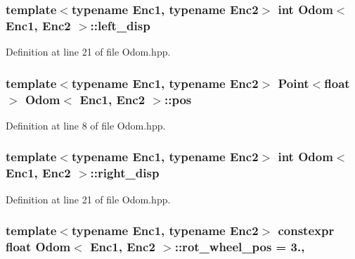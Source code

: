 \hypertarget{classOdom_aa29154456ebb189815df2501cc8eb2fd}{
\subsubsection[{left\-\_\-disp}]{\setlength{\rightskip}{0pt plus 5cm}template$<$typename Enc1, typename Enc2$>$ int {\bf Odom}$<$ Enc1, Enc2 $>$\-::left\-\_\-disp}}\label{classOdom_aa29154456ebb189815df2501cc8eb2fd}


Definition at line 21 of file Odom.\-hpp.

\hypertarget{classOdom_a0e43d9feb433dec91e7a08cee64d732b}{
\subsubsection[{pos}]{\setlength{\rightskip}{0pt plus 5cm}template$<$typename Enc1, typename Enc2$>$ {\bf Point}$<$float$>$ {\bf Odom}$<$ Enc1, Enc2 $>$\-::pos\hspace{0.3cm}{\ttfamily [private]}}}\label{classOdom_a0e43d9feb433dec91e7a08cee64d732b}


Definition at line 8 of file Odom.\-hpp.

\hypertarget{classOdom_a967a8ce7e6bea53de203e37cf180389a}{
\subsubsection[{right\-\_\-disp}]{\setlength{\rightskip}{0pt plus 5cm}template$<$typename Enc1, typename Enc2$>$ int {\bf Odom}$<$ Enc1, Enc2 $>$\-::right\-\_\-disp}}\label{classOdom_a967a8ce7e6bea53de203e37cf180389a}


Definition at line 21 of file Odom.\-hpp.

\hypertarget{classOdom_a3d72db210126e10ebcae996e1e707ce5}{
\subsubsection[{rot\-\_\-wheel\-\_\-pos}]{\setlength{\rightskip}{0pt plus 5cm}template$<$typename Enc1, typename Enc2$>$ constexpr float {\bf Odom}$<$ Enc1, Enc2 $>$\-::rot\-\_\-wheel\-\_\-pos = 3.\hspace{0.3cm}{\ttfamily [static]}, {\ttfamily [private]}}}\label{classOdom_a3d72db210126e10ebcae996e1e707ce5}



